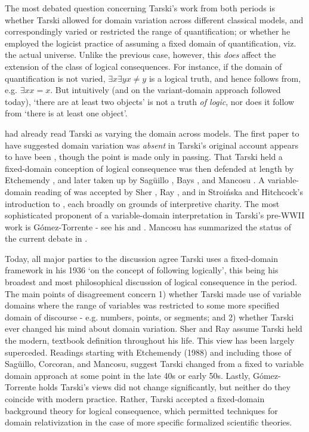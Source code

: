 \documentclass[]{article}
\begin{document}
The most debated question concerning Tarski's work from both periods is whether Tarski allowed for domain variation across different classical models, and correspondingly varied or restricted the range of quantification; or whether he employed the logicist practice of assuming a fixed domain of quantification, viz. the actual universe. Unlike the previous case, however, this \textit{does} affect the extension of the class of logical consequences. For instance, if the domain of quantification is not varied, $\exists x \exists y x \ne y$ is a logical truth, and hence follows from, e.g. $\exists x x = x$. But intuitively (and on the variant-domain approach followed today), `there are at least two objects' is not a truth \textit{of logic}, nor does it follow from `there is at least one object'.

\cite[325]{Church1956} had already read Tarski as varying the domain across models. The first paper to have suggested domain variation was \textit{absent} in Tarski's original account appears to have been \cite[43]{Corcoran1972}, though the point is made only in passing. That Tarski held a fixed-domain conception of logical consequence was then defended at length by Etchemendy \cite{Etchemendy1988} \cite{Etchemendy1990} \cite{Etchemendy2008}, and later taken up by Sag\"{u}illo \cite{Saguillo1997} \cite{Saguillo2009} \cite{Corcoran2011}, Bays \cite{Bays2001}, and Mancosu \cite{Mancosu2006} \cite{Mancosu2010a}. A variable-domain reading of \cite{Tarski2002} was accepted by Sher \cite{Sher1991} \cite{Sher1996}, Ray \cite{Ray1996}, and in Stroi\'{n}ska and Hitchcock's introduction to \cite{Tarski2002}, each broadly on grounds of interpretive charity. The most sophisticated proponent of a variable-domain interpretation in Tarski's pre-WWII work is G\'{o}mez-Torrente - see his \cite{Gomez-Torrente1996}  and \cite{Gomez-Torrente2009}. Mancosu has summarized the status of the current debate in \cite{Mancosu2010b}.

Today, all major parties to the discussion agree Tarski uses a fixed-domain framework in his 1936 `on the concept of following logically', this being his broadest and most philosophical discussion of logical consequence in the period. The main points of disagreement concern 1) whether Tarski made use of variable domains where the range of variables was restricted to some more specified domain of discourse - e.g. numbers, points, or segments; and 2) whether Tarski ever changed his mind about domain variation. Sher and Ray assume Tarski held the modern, textbook definition throughout his life. This view has been largely superceded. Readings starting with Etchemendy (1988) and including those of Sag\"{u}illo, Corcoran, and Mancosu, suggest Tarski changed from a fixed to variable domain approach at some point in the late 40s or early 50s. Lastly,  G\'{o}mez-Torrente holds Tarski's views did not change significantly, but neither do they coincide with modern practice. Rather, Tarski accepted a fixed-domain background theory for logical consequence, which permitted techniques for domain relativization in the case of more specific formalized scientific theories.
\end{document}
